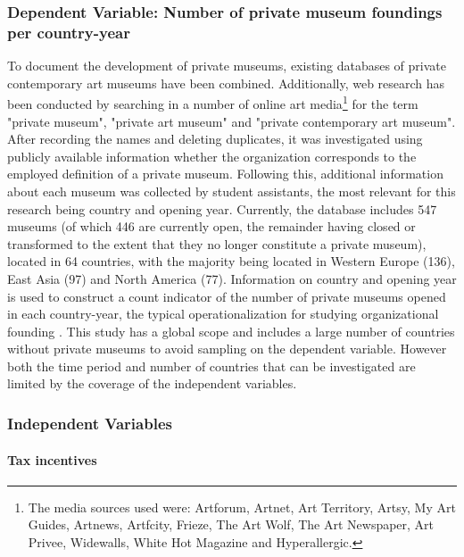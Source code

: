 \documentclass[11pt]{article}
\begin{document}
\subsubsection*{Dependent Variable: Number of private museum foundings per country-year}


To document the development of private museums, existing databases of private contemporary art museums \parencite{LarrysList_2015_report,Independent_collectors,global_private_museum_network_2020_museums,BMW_Independent_Collectors_2018_artguide,vdEerenbeemt_vdWauw_DDD_2016} have been combined.
Additionally, web research has been conducted by searching in a number of online art media\footnote{The media sources used were: Artforum, Artnet, Art Territory, Artsy, My Art Guides, Artnews, Artfcity, Frieze, The Art Wolf, The Art Newspaper, Art Privee, Widewalls, White Hot Magazine and Hyperallergic.} for the term "private museum", "private art museum" and "private contemporary art museum".
After recording the names and deleting duplicates, it was investigated using publicly available information whether the organization corresponds to the employed definition of a private museum.
Following this, additional information about each museum was collected by student assistants, the most relevant for this research being country and opening year.
Currently, the database includes 547 museums (of which 446 are currently open, the remainder having closed or transformed to the extent that they no longer constitute a private museum), located in 64 countries, with the majority being located in Western Europe (136), East Asia (97) and North America (77).
Information on country and opening year is used to construct a count indicator of the number of private museums opened in each country-year, the typical operationalization for studying organizational founding \parencite{Bogaert_etal_2014_ecological}. 
This study has a global scope and  includes a large number of countries without private museums to avoid sampling on the dependent variable. 
However both the time period and number of countries that can be investigated are limited by the coverage of the independent variables. 


\subsubsection*{Independent Variables}

\paragraph*{Tax incentives}
\end{document}
